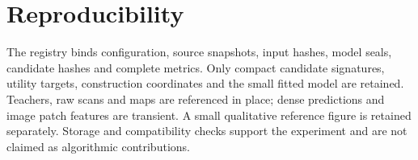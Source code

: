 \documentclass[10pt]{article}
\begin{document}

\section{Reproducibility}
The registry binds configuration, source snapshots, input hashes, model seals,
candidate hashes and complete metrics. Only compact candidate signatures,
utility targets, construction coordinates and the small fitted model are
retained. Teachers, raw scans and maps are referenced in place; dense predictions
and image patch features are transient. A small qualitative reference figure is
retained separately. Storage and compatibility checks support the experiment and
are not claimed as algorithmic contributions.


\end{document}
